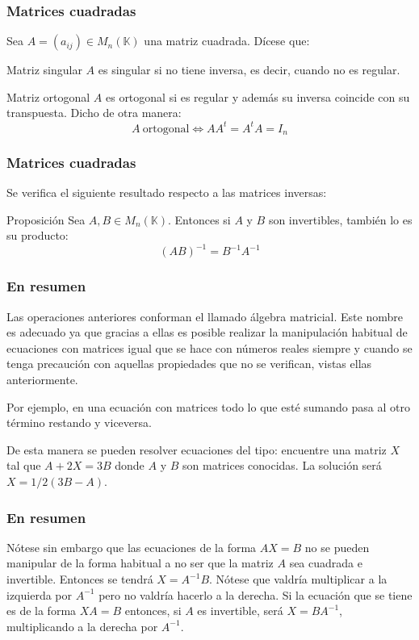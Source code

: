 \documentclass[12pt]{article}
\begin{document}
 

 \begin{frame}
  \frametitle{Matrices cuadradas}
Sea $A=(a_{ij})\in M_n(\mathbb{K})$ una matriz cuadrada. D\'icese que:
 
  \begin{block}{Matriz singular}
$A$ es singular si no tiene inversa, es decir, cuando no es regular.
\end{block}


  \begin{block}{Matriz ortogonal}
$A$ es ortogonal si es regular y adem\'as su inversa coincide con su transpuesta. Dicho de otra manera:
\[A \ \mathrm{ortogonal} \Longleftrightarrow AA^t = A^tA= I_n \]

\end{block}
 \end{frame} 



 \begin{frame}
  \frametitle{Matrices cuadradas}
Se verifica el siguiente resultado respecto a las matrices inversas:
  
  \begin{block}{Proposici\'on}
Sea $A,B\in M_n(\mathbb{K})$. Entonces si $A$ y $B$ son invertibles, tambi\'en lo es su producto: 
\[(AB)^{-1} = B^{-1}A^{-1}\]
\end{block}

 \end{frame} 
 
 \begin{frame}
  \frametitle{En resumen}
  
  Las operaciones anteriores conforman el llamado \'algebra matricial. Este nombre es adecuado ya que gracias a ellas es posible realizar la manipulaci\'on habitual de ecuaciones con matrices igual que se hace con n\'umeros reales siempre y cuando se tenga precauci\'on con aquellas propiedades que no se verifican, vistas ellas anteriormente.
  
  Por ejemplo, en una ecuaci\'on con matrices todo lo que est\'e sumando pasa al otro t\'ermino restando y viceversa. 
  
  De esta manera se pueden resolver ecuaciones del tipo: encuentre una matriz $X$ tal que $A+2X =3B$ donde $A$ y $B$ son matrices conocidas. La soluci\'on ser\'a $X=1/2(3B-A)$.
  \end{frame}
  
   \begin{frame}
  \frametitle{En resumen}
   N\'otese sin embargo que las ecuaciones de la forma $AX=B$ no se pueden manipular de la forma habitual a no ser que la matriz $A$ sea cuadrada e invertible. Entonces se tendr\'a $X=A^{-1}B$. N\'otese que valdr\'ia multiplicar a la izquierda por $A^{-1}$ pero no valdr\'ia hacerlo a la derecha. Si la ecuaci\'on que se tiene es de la forma $XA=B$ entonces, si $A$ es invertible, ser\'a $X=BA^{-1}$, multiplicando a la derecha por $A^{-1}$.
\end{frame}
\end{document}
